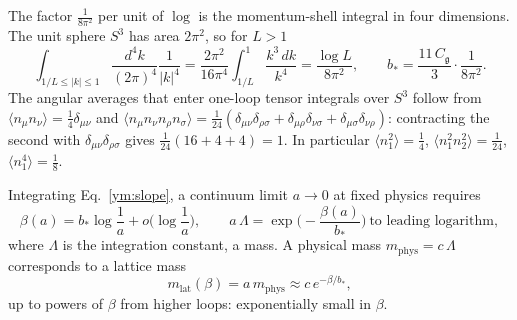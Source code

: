 The factor $\frac{1}{8\pi^2}$ per unit of $\log$ is the momentum-shell
integral in four dimensions. The unit sphere $S^3$ has area $2\pi^2$, so for
$L>1$
\begin{equation}\label{ym:shell}
 \int_{1/L\le|k|\le1}\frac{d^4k}{(2\pi)^4}\frac{1}{|k|^4}
 =\frac{2\pi^2}{16\pi^4}\int_{1/L}^{1}\frac{k^3\,dk}{k^4}
 =\frac{\log L}{8\pi^2},\qquad
 b_*=\frac{11\,C_{\mathfrak g}}{3}\cdot\frac{1}{8\pi^2}.
\end{equation}
The angular averages that enter one-loop tensor integrals over $S^3$ follow
from $\langle n_\mu n_\nu\rangle=\frac14\delta_{\mu\nu}$ and
$\langle n_\mu n_\nu n_\rho n_\sigma\rangle=\frac{1}{24}
(\delta_{\mu\nu}\delta_{\rho\sigma}+\delta_{\mu\rho}\delta_{\nu\sigma}
+\delta_{\mu\sigma}\delta_{\nu\rho})$: contracting the second with
$\delta_{\mu\nu}\delta_{\rho\sigma}$ gives $\frac{1}{24}(16+4+4)=1$. In
particular $\langle n_1^2\rangle=\frac14$,
$\langle n_1^2n_2^2\rangle=\frac1{24}$, $\langle n_1^4\rangle=\frac18$.

Integrating Eq.~\eqref{ym:slope}, a continuum limit $a\to0$ at fixed physics
requires
\begin{equation}\label{ym:scaling-law}
 \beta(a)=b_*\log\frac1a+o\Big(\log\frac1a\Big),\qquad
 a\,\Lambda=\exp\Big(-\frac{\beta(a)}{b_*}\Big)\ \text{to leading logarithm},
\end{equation}
where $\Lambda$ is the integration constant, a mass. A physical mass
$m_{\mathrm{phys}}=c\,\Lambda$ corresponds to a lattice mass
\begin{equation}\label{ym:lattice-mass}
 m_{\mathrm{lat}}(\beta)=a\,m_{\mathrm{phys}}\approx c\,e^{-\beta/b_*},
\end{equation}
up to powers of $\beta$ from higher loops: exponentially small in $\beta$.

